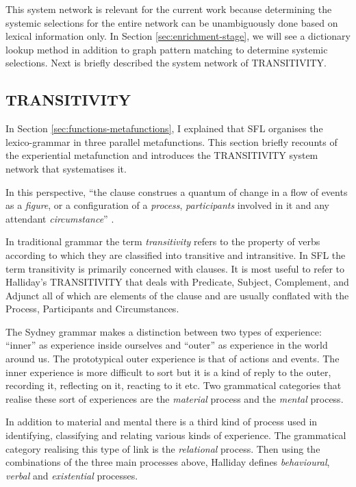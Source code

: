     This system network is relevant for the current work because determining the systemic selections for the entire network can be unambiguously done based on lexical information only. In Section \ref{sec:enrichment-stage}, we will see a dictionary lookup method in addition to graph pattern matching to determine systemic selections. Next is briefly described the system network of TRANSITIVITY. 
      
\subsection{TRANSITIVITY}
\label{sec:transitivity}
    In Section \ref{sec:functions-metafunctions}, I explained that SFL organises the lexico-grammar in three parallel metafunctions. This section briefly recounts of the experiential metafunction and introduces the TRANSITIVITY system network that systematises it.
    
    In this perspective, ``the clause construes a quantum of change in a flow of events as a \textit{figure}, or a configuration of a \textit{process}, \textit{participants} involved in it and any attendant \textit{circumstance}'' \citep[212]{Halliday2013}. 
    
    In traditional grammar the term \textit{transitivity} refers to the property of verbs according to which they are classified into transitive and intransitive. In SFL the term transitivity is primarily concerned with clauses. It is most useful to refer to Halliday's TRANSITIVITY \citep{Halliday67-parts1+2,Halliday68-part3,Halliday68} that deals with Predicate, Subject, Complement, and Adjunct all of which are elements of the clause and are usually conflated with the Process, Participants and Circumstances. 

    The Sydney grammar makes a distinction between two types of experience: ``inner'' as experience inside ourselves and ``outer'' as experience in the world around us. The prototypical outer experience is that of actions and events. The inner experience is more difficult to sort but it is a kind of reply to the outer, recording it, reflecting on it, reacting to it etc. Two grammatical categories that realise these sort of experiences are the \textit{material} process and the \textit{mental} process.
    
    In addition to material and mental there is a third kind of process used in identifying, classifying and relating various kinds of experience. The grammatical category realising this type of link is the \textit{relational} process. Then using the combinations of the three main processes above, Halliday defines \textit{behavioural}, \textit{verbal} and \textit{existential} processes. 

